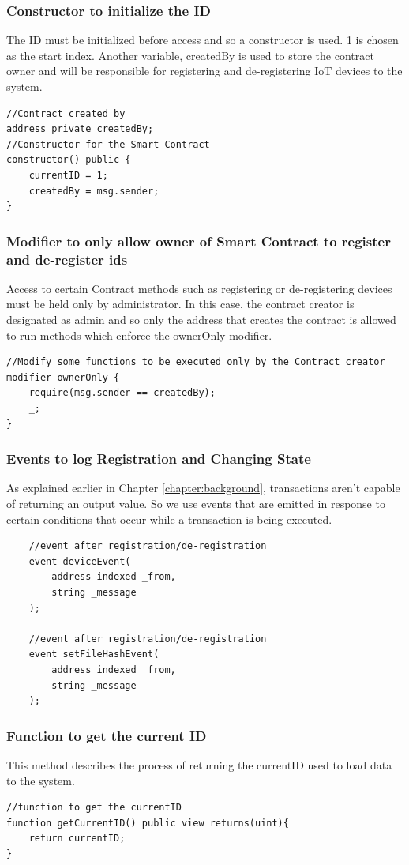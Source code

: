 \documentclass[11pt,openright]{report}
\begin{document}
\subsubsection{Constructor to initialize the ID}
The ID must be initialized before access and so a constructor is used. 1  is chosen as the start index. Another variable, createdBy is used to store the contract owner and will be responsible for registering and de-registering IoT devices to the system.
\begin{verbatim}
//Contract created by
address private createdBy;
//Constructor for the Smart Contract
constructor() public {
    currentID = 1;
    createdBy = msg.sender;
}
\end{verbatim}

\subsubsection{Modifier to only allow owner of Smart Contract to register and de-register ids}
Access to certain Contract methods such as registering or de-registering devices must be held only by administrator. In this case, the contract creator is designated as admin and so only the address that creates the contract is allowed to run methods which enforce the ownerOnly modifier.
\begin{verbatim}
//Modify some functions to be executed only by the Contract creator
modifier ownerOnly {
    require(msg.sender == createdBy);
    _;
}
\end{verbatim}

\subsubsection{Events to log Registration and Changing State}
As explained earlier in Chapter \ref{chapter:background}, transactions aren't capable of returning an output value. So we use events that are emitted in response to certain conditions that occur while a transaction is being executed.

\begin{verbatim}
    //event after registration/de-registration
    event deviceEvent(
        address indexed _from,
        string _message
    );
    
    //event after registration/de-registration
    event setFileHashEvent(
        address indexed _from,
        string _message
    );
\end{verbatim}

\subsubsection{Function to get the current ID}
This method describes the process of returning the currentID used to load data to the system.
\begin{verbatim}
//function to get the currentID
function getCurrentID() public view returns(uint){
    return currentID;
}
\end{verbatim}
\end{document}
